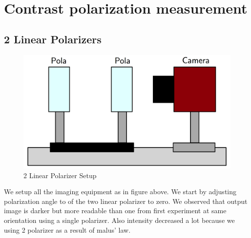 \documentclass{article}
\begin{document}
	
	
	
\section{Contrast polarization measurement}

	\subsection{2 Linear Polarizers}
	\begin{figure}[H]
	\centering
	\includegraphics[scale=0.2]{polaSetup2.png}
	\caption{2 Linear Polarizer Setup}
	\end{figure}
	We setup all the imaging equipment as in figure above. We start by adjusting polarization angle to of the two linear polarizer to zero. We observed that output image is darker but more readable than one from first experiment at same orientation using a single polarizer. Also intensity decreased a lot because we using 2 polarizer as a result of malus' law.
	
	
	
	
	
\end{document}
